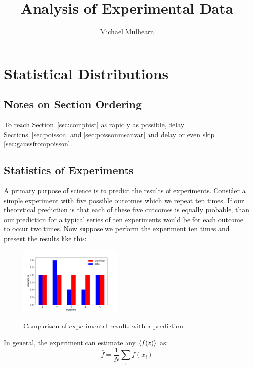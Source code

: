 \documentclass[12pt,oneside]{book}
\begin{document}
\title{Analysis of Experimental Data}
\author{Michael Mulhearn}

\maketitle

\chapter{Statistical Distributions}

\section{Notes on Section Ordering}

To reach Section~\ref{sec:comphist} as rapidly as possible, delay
Sections~\ref{sec:poisson} and \ref{sec:poissonmeanvar} and delay or
even skip \ref{sec:gaussfrompoisson}.

\section{Statistics of Experiments}

A primary purpose of science is to predict the results of experiments.
Consider a simple experiment with five possible outcomes which we
repeat ten times.  If our theoretical prediction is that each of these
five outcomes is equally probable, than our prediction for a typical
series of ten experiments would be for each outcome to occur two
times.  Now suppose we perform the experiment ten times and present
the results like this:

\begin{figure}[htbp]
\begin{center}
{\includegraphics[width=0.45\textwidth]{figs/intro.pdf}}
\end{center}
\caption{\label{fig:intro} Comparison of experimental results with a prediction.}
\end{figure}

In general, the experiment can estimate any $\braket{f(x)}$ as:
\begin{displaymath}
\bar{f} = \frac{1}{N} \sum_i f(x_i)
\end{displaymath}
\end{document}
